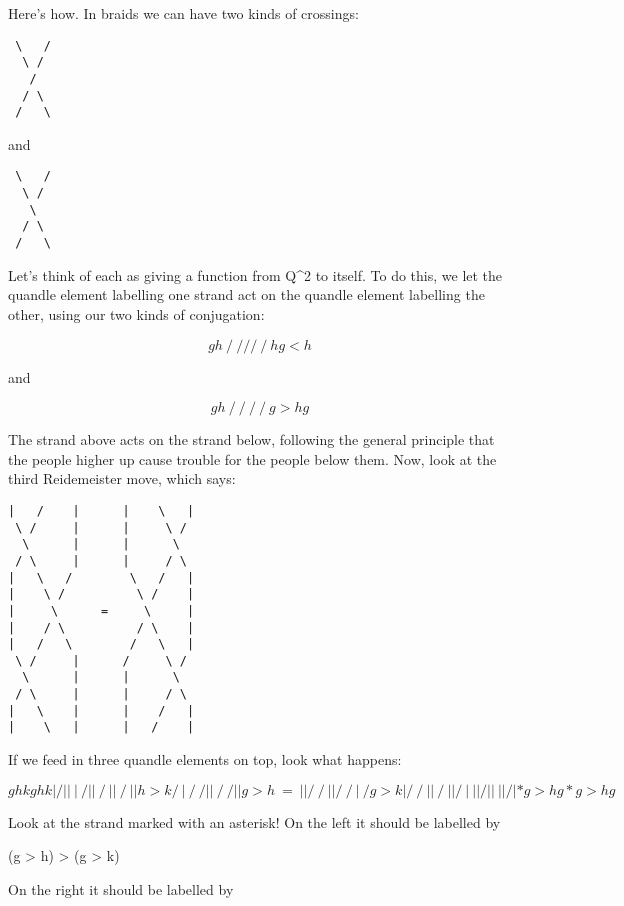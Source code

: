 Here's how.  In braids we can have two kinds of crossings:

\begin{verbatim}
 \   /
  \ /
   /
  / \
 /   \
\end{verbatim}
    

and

\begin{verbatim}
 \   /
  \ /
   \
  / \
 /   \
\end{verbatim}
    

Let's think of each as giving a function from Q^{2} to itself.  To
do this, we let the quandle element labelling one strand act on the 
quandle element labelling the other, using our two kinds of 
conjugation:

$$
g     h
 \   /
  \ /
   /
  / \
 /   \
h    g<h
$$
    
and

$$
g     h
 \   /
  \ /
   \
  / \
 /   \
g>h   g
$$
    

The strand above acts on the strand below, following the general
principle that the people higher up cause trouble for the people below
them.  Now, look at the third Reidemeister move, which says:

\begin{verbatim}
|   /    |      |    \   |
 \ /     |      |     \ / 
  \      |      |      \
 / \     |      |     / \
|   \   /        \   /   |
|    \ /          \ /    |
|     \      =     \     |	
|    / \          / \    |
|   /   \        /   \   |
 \ /     |      /     \ / 
  \      |      |      \  
 / \     |      |     / \ 
|   \    |      |    /   |
|    \   |      |   /    |
\end{verbatim}
    

If we feed in three quandle elements on top, look what happens:

$$
g    h   k      g   h    k
|   /    |      |    \   |
 \ /     |      |     \ / 
  \      |      |      \
 / \     |      |  h>k/ \
|   \   /        \   /   |
|    \ /          \ /    |
|g>h  \      =     \     |	
|    / \          / \    |
|   /   \        /   \   |
 \ /g>k  |      /     \ / 
  \      |      |      \  
 / \     |      |     / \ 
|   \    |      |    /   |
|    \   |      |   /    |
*   g>h  g      *  g>h   g
$$
    

Look at the strand marked with an asterisk!  On the left it should be
labelled by

(g > h) > (g > k)

On the right it should be labelled by 

